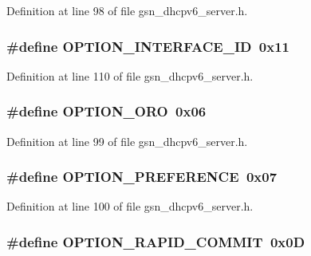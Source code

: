 Definition at line 98 of file gsn\_\-dhcpv6\_\-server.h.

\hypertarget{a00483_a2974485f1ecc8f0cd4336e1c9a33fbbc}{
\subsubsection[{OPTION\_\-INTERFACE\_\-ID}]{\setlength{\rightskip}{0pt plus 5cm}\#define OPTION\_\-INTERFACE\_\-ID~0x11}}
\label{a00483_a2974485f1ecc8f0cd4336e1c9a33fbbc}


Definition at line 110 of file gsn\_\-dhcpv6\_\-server.h.

\hypertarget{a00483_a628e8c190e5d28f8ac6165ea7611b06b}{
\subsubsection[{OPTION\_\-ORO}]{\setlength{\rightskip}{0pt plus 5cm}\#define OPTION\_\-ORO~0x06}}
\label{a00483_a628e8c190e5d28f8ac6165ea7611b06b}


Definition at line 99 of file gsn\_\-dhcpv6\_\-server.h.

\hypertarget{a00483_a6655906f14b043b58a5172ea8b152b2c}{
\subsubsection[{OPTION\_\-PREFERENCE}]{\setlength{\rightskip}{0pt plus 5cm}\#define OPTION\_\-PREFERENCE~0x07}}
\label{a00483_a6655906f14b043b58a5172ea8b152b2c}


Definition at line 100 of file gsn\_\-dhcpv6\_\-server.h.

\hypertarget{a00483_a0581c160f85ebbc711f548fe1687ddfb}{
\subsubsection[{OPTION\_\-RAPID\_\-COMMIT}]{\setlength{\rightskip}{0pt plus 5cm}\#define OPTION\_\-RAPID\_\-COMMIT~0x0D}}
\label{a00483_a0581c160f85ebbc711f548fe1687ddfb}


